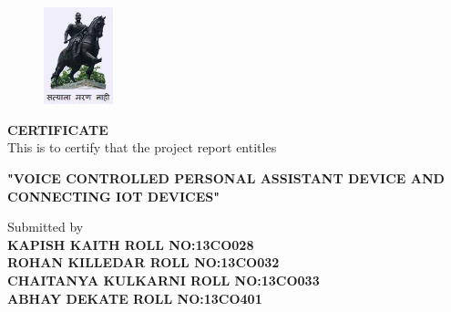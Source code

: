 
%
\noindent
\begin{figure}
  \begin{flushleft}
    \includegraphics[width=2cm]{logo.png}
  \end{flushleft}
  \end{figure}
 
	
%
\begin {center}

{\LARGE\bf CERTIFICATE}\\\vspace{1.4cm}
\large {This is to certify that the project report entitles}\\\vspace{0.7cm}

{\bf "VOICE CONTROLLED PERSONAL ASSISTANT DEVICE AND CONNECTING IOT DEVICES"}\\\vspace{0.7cm}

\large {Submitted by}\\\vspace{0.5cm}
{\small\bf{KAPISH KAITH} \hspace{36.5mm} {\small ROLL NO:13CO028 } \\{ROHAN KILLEDAR} \hspace{29mm} {\small ROLL NO:13CO032 } \\{CHAITANYA KULKARNI} \hspace{17mm} {\small ROLL NO:13CO033 }\\{ABHAY DEKATE} \hspace{35mm} {\small ROLL NO:13CO401 }}

\end{center}
\vspace{3mm} 




